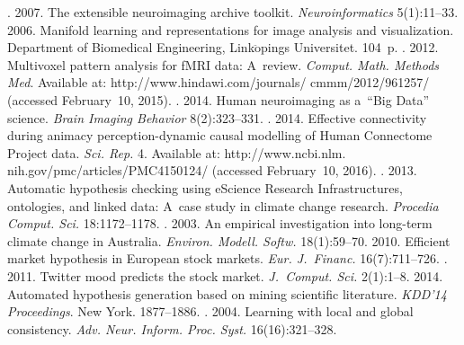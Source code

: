 \begin{multicols}{2}
{{\begin{thebibliography}{99}
. 2007. The
extensible neuroimaging archive toolkit. \textit{Neuroinformatics} 5(1):11--33.
 2006. {Manifold learning and representations for image analysis
and visualization}. Department of Biomedical Engineering,
Link$\ddot{\mbox{o}}$pings Universitet. 104~p.
.
2012. Multivoxel pattern analysis for fMRI data: A~review. \textit{Comput.
Math. Methods Med}. Available at: {\sf
http://www.hindawi.com/journals/ cmmm/2012/961257/} (accessed February~10,
2015).
. 2014. Human neuroimaging as a~``Big
Data'' science. \textit{Brain Imaging Behavior} 8(2):323--331.
. 2014. Effective
connectivity during animacy perception-dynamic causal modelling of Human
Connectome Project data. \textit{Sci. Rep.} 4. Available at: {\sf
http://www.ncbi.nlm. nih.gov/pmc/articles/PMC4150124/} (accessed February~10,
2016).
. 2013.
Automatic hypothesis checking using eScience Research Infrastructures, ontologies,
and linked data: A~case study in climate change research. \textit{Procedia Comput.
Sci.} 18:1172--1178.
. 2003. An empirical investigation into
long-term climate change in Australia. \textit{Environ. Modell. Softw.}
18(1):59--70.
 2010. Efficient market hypothesis in European stock markets.
\textit{Eur. J.~Financ.} 16(7):711--726.
. 2011. Twitter mood predicts the stock
market. \textit{J.~Comput. Sci.} 2(1):1--8.
 2014. Automated
hypothesis generation based on mining scientific literature. \textit{KDD'14
Proceedings}. New York. 1877--1886.
. 2004. Learning with local and global consistency.
\textit{Adv. Neur. Inform. Proc. Syst.} 16(16):321--328.

\end{thebibliography} } }

\end{multicols}

\vspace*{-3pt}

